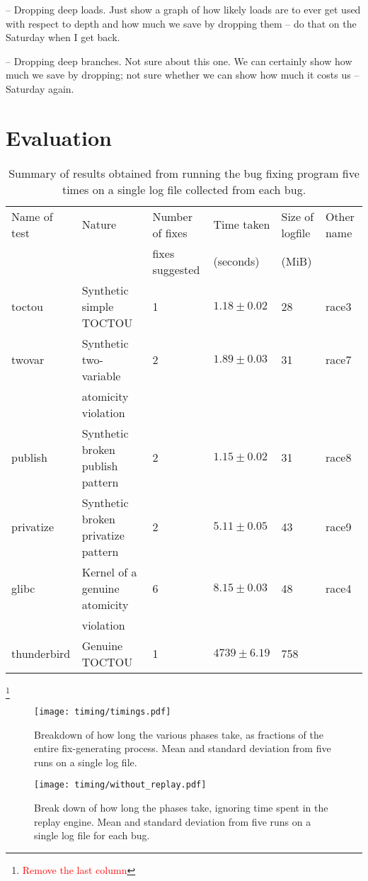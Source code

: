 \documentclass[10pt,twocolumn,preprint,natbib,authoryear]{sigplanconf}
\newcommand{\editorial}[1]{\textcolor{red}{\footnote{\textcolor{red}{#1}}}}
\begin{document}
-- Dropping deep loads.  Just show a graph of how likely loads are to
ever get used with respect to depth and how much we save by dropping
them -- do that on the Saturday when I get back.

-- Dropping deep branches.  Not sure about this one.  We can certainly
show how much we save by dropping; not sure whether we can show how
much it costs us -- Saturday again.

\section{Evaluation}

\begin{table*}
\begin{tabular}{llllll}
Name of test & Nature & Number of fixes & Time taken & Size of logfile & Other name\\
 & & fixes suggested & (seconds) & (MiB) & \\
\hline
toctou & Synthetic simple TOCTOU & 1 & $1.18 \pm 0.02$ & 28 & race3\\
twovar & Synthetic two-variable & 2 & $1.89 \pm 0.03$ & 31 & race7\\
       & atomicity violation &&&&\\
publish & Synthetic broken publish pattern & 2 & $1.15 \pm 0.02$ & 31 & race8\\
privatize & Synthetic broken privatize pattern & 2 & $5.11 \pm 0.05$ & 43 & race9\\
\hline
glibc & Kernel of a genuine atomicity & 6 & $8.15 \pm 0.03$ & 48 & race4\\
      & violation & & & & \\
\hline
thunderbird & Genuine TOCTOU & 1 & $4739 \pm 6.19$ & 758 &
\end{tabular}\editorial{Remove the last column}
\caption{Summary of results obtained from running the bug fixing
  program five times on a single log file collected from each bug.}
\end{table*}

\begin{figure*}
\texttt{[image: timing/timings.pdf]}
\caption{Breakdown of how long the various phases take, as fractions
  of the entire fix-generating process.  Mean and standard deviation
  from five runs on a single log file.}
\end{figure*}

\begin{figure*}
\texttt{[image: timing/without\_replay.pdf]}
\caption{Break down of how long the phases take, ignoring time spent
  in the replay engine.  Mean and standard deviation from five runs on
  a single log file for each bug.}
\end{figure*}
\end{document}
